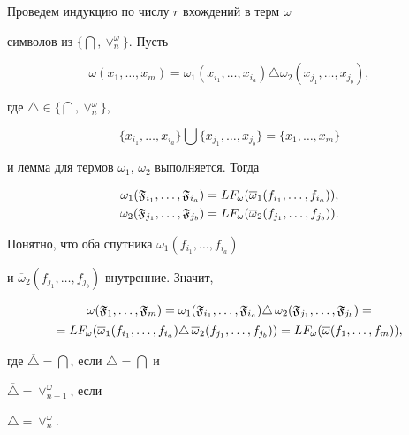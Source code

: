 \begin{pf}


Проведем индукцию по числу $r$ вхождений в терм $\omega$


символов из $\{\bigcap,\vee_n^{\omega}\}$. Пусть


$$


\omega (x_1,\dotsc,x_m)=\omega_1(x_{i_1},\dotsc,x_{i_a})


\triangle\omega_2(x_{j_1},\dotsc,x_{j_b}),


$$


где $\triangle\in\{\bigcap,\vee_n^{\omega}\}$,


$$


\{x_{i_1},\dotsc,x_{i_a}\}\bigcup\{x_{j_1},\dotsc,x_{j_b}\}=\{x_1,\dotsc,x_m\}


$$


и лемма для термов $\omega_1$, $\omega_2$ выполняется. Тогда


\begin{align*}


\omega_1(\frak{F}_{i_1},\dotsc,\frak{F}_{i_a})&=


LF_{\omega}(\overline{\omega}_1(f_{i_1},\dotsc,f_{i_a})), \\


\omega_2(\frak{F}_{j_1},\dotsc,\frak{F}_{j_b})&=


LF_{\omega}(\overline{\omega}_2(f_{j_1},\dotsc,f_{j_b})).


\end{align*}


Понятно, что оба спутника $\overline{\omega}_1(f_{i_1},\dotsc,f_{i_a})$


и $\overline{\omega}_2(f_{j_1},\dotsc,f_{j_b})$ внутренние. Значит,


\begin{multline*}


\omega (\frak{F}_1,\dotsc,\frak{F}_m)=\omega_1(\frak{F}_{i_1},\dotsc,


\frak{F}_{i_a})\triangle\,\omega_2(\frak{F}_{j_1},\dotsc,\frak{F}_{j_b})=\\


=LF_{\omega}(\overline{\omega}_1(f_{i_1},\dotsc,


f_{i_a})\overline{\triangle}\,\overline{\omega}_2(f_{j_1},\dotsc,f_{j_b}))


=LF_{\omega}(\overline{\omega}(f_1,\dotsc,f_m)),


\end{multline*}


где $\overline{\triangle}=\bigcap$, если $\triangle =\bigcap$ и


$\overline{\triangle}=\vee_{n-1}^{\omega}$, если


$\triangle =\vee_n^{\omega}$.


\end{pf}





